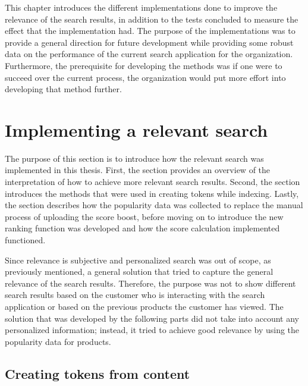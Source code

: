 
This chapter introduces the different implementations done to improve the relevance of the search results,
in addition to the tests concluded to measure the effect that the implementation had.
The purpose of the implementations was to provide a general direction for future development 
while providing some robust data on the performance of the current search application for the organization.
Furthermore, the prerequisite for developing the methods was if one were to succeed over the current
process, the organization would put more effort into developing that method further.



\section{Implementing a relevant search}


The purpose of this section is to introduce how the relevant search was implemented in this thesis.
First, the section provides an overview of the interpretation of how to achieve more relevant search 
results.
Second, the section introduces the methods that were used in creating tokens while indexing.
Lastly, the section describes how the popularity data was collected to replace
the manual process of uploading the score boost, before moving on to introduce
the new ranking function was developed and how the score calculation implemented functioned.


Since relevance is subjective and personalized search was out of scope, as previously mentioned,
a general solution that tried to capture the general relevance of the search results.
Therefore, the purpose was not to show different search results based on the customer who is interacting
with the search application or based on the previous products the customer has viewed.
The solution that was developed by the following parts did not take into account any personalized
information; instead, it tried to achieve good relevance by using the popularity data for products.



\subsection{Creating tokens from content}
\label{ss:methodsTokens}


